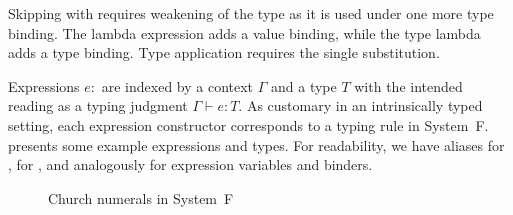 \documentclass[manuscript,screen,review,anonymous,acmsmall]{acmart}
\begin{document}
Skipping with  requires weakening of the type as it is used
under one more type binding. The lambda expression adds a value binding, while the type
lambda adds a type binding. Type application requires the single substitution. 

Expressions $e : $ \AgdaSpace{}%
\AgdaSpace{}%
 are indexed by a context $\Gamma$ and a type $T$ with the intended
reading as a typing judgment $\Gamma \vdash e : T$. As customary in an intrinsically typed
setting, each expression constructor corresponds to a typing rule in System~F.
 presents some example expressions and types.  For
readability, we have aliases  for ,
 for , and analogously for
expression variables and binders.



\begin{figure}[tp]

  \noindent\begin{minipage}[t]{0.49\linewidth}
    \FCNType
  \end{minipage}\hfill\begin{minipage}[t]{0.49\linewidth}
    \FCNZero
  \end{minipage}


\noindent\begin{minipage}[t]{0.49\linewidth}
  \FCNOne
\end{minipage}\hfill\begin{minipage}[t]{0.49\linewidth}
  \FCNTwo
\end{minipage}

\FCNSucc

\caption{Church numerals in System~F}
\label{fig:example-system-f-expressions}
\end{figure}
\end{document}
